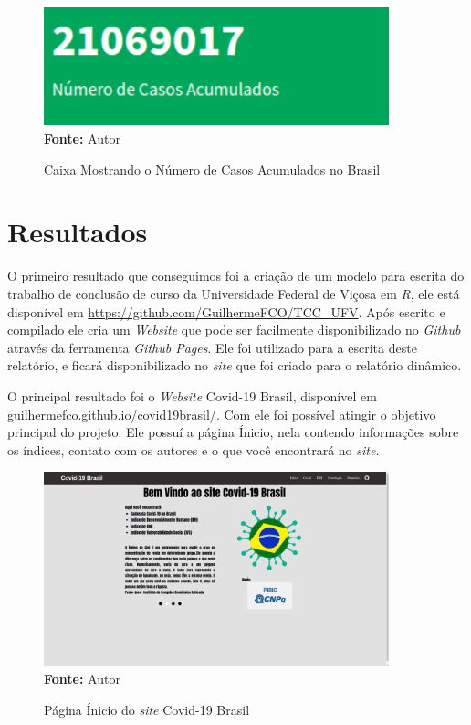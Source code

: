 \documentclass[
  fleqn,ebook]{ic}
\begin{document}
\begin{figure}[H]
    \centering
    \caption{Caixa Mostrando o Número de Casos Acumulados no Brasil}
    \includegraphics[width=10cm]{img/caixa.png} \\
    {\footnotesize \textbf{Fonte: }Autor}
    \label{fig:caixa}
\end{figure}

\hypertarget{Resultados}{%
\section{Resultados}\label{Resultados}}

O primeiro resultado que conseguimos foi a criação de um modelo para escrita
do trabalho de conclusão de curso da Universidade Federal de Viçosa em \emph{R}, ele
está disponível em \url{https://github.com/GuilhermeFCO/TCC_UFV}. Após escrito
e compilado ele cria um \emph{Website} que pode ser facilmente disponibilizado no
\emph{Github} através da ferramenta \emph{Github Pages}. Ele foi utilizado para a escrita
deste relatório, e ficará disponibilizado no \emph{site} que foi criado para o
relatório dinâmico.

O principal resultado foi o \emph{Website} Covid-19 Brasil, disponível em
\url{guilhermefco.github.io/covid19brasil/}. Com ele foi possível atingir o
objetivo principal do projeto. Ele possuí a página Ínicio, nela contendo
informações sobre os índices, contato com os autores e o que você encontrará
no \emph{site}.

\begin{figure}[H]
    \centering
    \caption{Página Ínicio do \textit{site} Covid-19 Brasil}
    \includegraphics[width=10cm]{img/inicio.png} \\
    {\footnotesize \textbf{Fonte: }Autor}
    \label{fig:inicio}
\end{figure}
\end{document}
